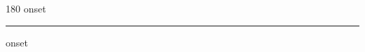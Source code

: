 
\begin{frame}
\begin{center}
\begin{turn}{180}
{\fontsize{2.5cm}{1em}\selectfont onset}
\end{turn}
\vspace{1em}\par  
\hrule
\vspace{1em}\par  
{\fontsize{2.5cm}{1em}\selectfont onset}
\end{center}
\end{frame}
